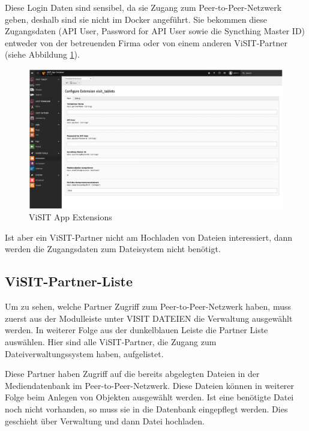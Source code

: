 Diese Login Daten sind sensibel, da sie Zugang zum Peer-to-Peer-Netzwerk geben, deshalb sind sie nicht im Docker angeführt. Sie bekommen diese Zugangsdaten (API User, Password for API User sowie die Syncthing Master ID) entweder von der betreuenden Firma oder von einem anderen ViSIT-Partner (siehe Abbildung \ref{img:extensions}).\\

\begin{figure}[ht!]
\centering
\includegraphics[width=12cm]{Figures/paula/dateiverwaltung/extensions.png}
\caption{ViSIT App Extensions}
\label{img:extensions}
\end{figure}

Ist aber ein ViSIT-Partner nicht am Hochladen von Dateien interessiert, dann werden die Zugangsdaten zum Dateisystem nicht benötigt.

\subsection{ViSIT-Partner-Liste}

Um zu sehen, welche Partner Zugriff zum Peer-to-Peer-Netzwerk haben, muss zuerst aus der Modulleiste unter VISIT DATEIEN die \glqq Verwaltung\grqq{} ausgewählt werden. In weiterer Folge  aus der dunkelblauen Leiste die \glqq Partner Liste\grqq{} auswählen. Hier sind alle ViSIT-Partner, die Zugang zum Dateiverwaltungssystem haben, aufgelistet.

Diese Partner haben Zugriff auf die bereits abgelegten Dateien in der Mediendatenbank im Peer-to-Peer-Netzwerk. Diese Dateien können in weiterer Folge beim Anlegen von Objekten ausgewählt werden. Ist eine benötigte Datei noch nicht vorhanden, so muss sie in die Datenbank eingepflegt werden. Dies geschieht über Verwaltung und dann Datei hochladen.\\

